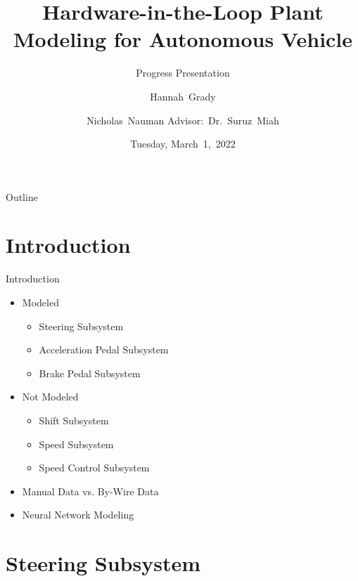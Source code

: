 \documentclass{beamer}
\title[HIL Plant Modeling]{Hardware-in-the-Loop Plant Modeling for Autonomous
  Vehicle}
\subtitle{Progress Presentation}
\author[H.~Grady, N.~Nauman]{Hannah~Grady \and Nicholas~Nauman 
\linebreak Advisor:~Dr.~Suruz~Miah}
\institute[Bradley University] %
{
  Department of Electrical and Computer Engineering\\
  Bradley University\\
  1501 W. Bradley Avenue\\
  Peoria, IL, 61625, USA
}
\date[March~1,~2022]{Tuesday, March~1,~2022}
\begin{document}
\begin{frame}
  \titlepage
\end{frame}

\begin{frame}{Outline} 
  \tableofcontents%
\end{frame}

\section{Introduction}

\begin{frame}{Introduction}{}
    \begin{block}{}
    	\begin{itemize}
    		\item Modeled
			\begin{itemize}
				\item Steering Subsystem
    				\item Acceleration Pedal Subsystem
    				\item Brake Pedal Subsystem
			\end{itemize}			    			
    		\item Not Modeled
			\begin{itemize}
				\item Shift Subsystem
    				\item Speed Subsystem
    				\item Speed Control Subsystem
			\end{itemize}			    			
    		\item Manual Data vs. By-Wire Data
    		\item Neural Network Modeling \cite{Zhou2019} \cite{matlabNeuralNet}
		\end{itemize}
    \end{block}
        
\end{frame}



\section{Steering Subsystem}
\end{document}

